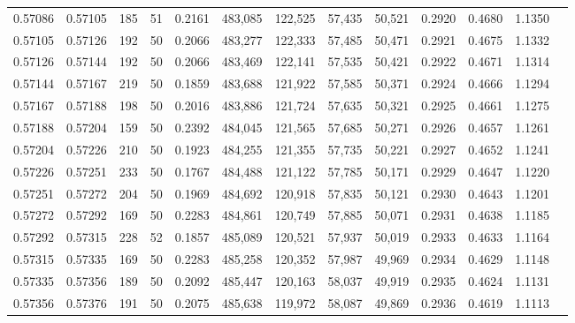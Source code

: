 \begin{tabular}{rrrrrrrrrrrrr}
0.57086 & 0.57105 &   185 &  51 &                                     0.2161 & 483,085 & 122,525 &  57,435 &  50,521 & 0.2920 & 0.4680 & 1.1350 \\
0.57105 & 0.57126 &   192 &  50 &                                     0.2066 & 483,277 & 122,333 &  57,485 &  50,471 & 0.2921 & 0.4675 & 1.1332 \\
0.57126 & 0.57144 &   192 &  50 &                                     0.2066 & 483,469 & 122,141 &  57,535 &  50,421 & 0.2922 & 0.4671 & 1.1314 \\
0.57144 & 0.57167 &   219 &  50 &                                     0.1859 & 483,688 & 121,922 &  57,585 &  50,371 & 0.2924 & 0.4666 & 1.1294 \\
0.57167 & 0.57188 &   198 &  50 &                                     0.2016 & 483,886 & 121,724 &  57,635 &  50,321 & 0.2925 & 0.4661 & 1.1275 \\
0.57188 & 0.57204 &   159 &  50 &                                     0.2392 & 484,045 & 121,565 &  57,685 &  50,271 & 0.2926 & 0.4657 & 1.1261 \\
0.57204 & 0.57226 &   210 &  50 &                                     0.1923 & 484,255 & 121,355 &  57,735 &  50,221 & 0.2927 & 0.4652 & 1.1241 \\
0.57226 & 0.57251 &   233 &  50 &                                     0.1767 & 484,488 & 121,122 &  57,785 &  50,171 & 0.2929 & 0.4647 & 1.1220 \\
0.57251 & 0.57272 &   204 &  50 &                                     0.1969 & 484,692 & 120,918 &  57,835 &  50,121 & 0.2930 & 0.4643 & 1.1201 \\
0.57272 & 0.57292 &   169 &  50 &                                     0.2283 & 484,861 & 120,749 &  57,885 &  50,071 & 0.2931 & 0.4638 & 1.1185 \\
0.57292 & 0.57315 &   228 &  52 &                                     0.1857 & 485,089 & 120,521 &  57,937 &  50,019 & 0.2933 & 0.4633 & 1.1164 \\
0.57315 & 0.57335 &   169 &  50 &                                     0.2283 & 485,258 & 120,352 &  57,987 &  49,969 & 0.2934 & 0.4629 & 1.1148 \\
0.57335 & 0.57356 &   189 &  50 &                                     0.2092 & 485,447 & 120,163 &  58,037 &  49,919 & 0.2935 & 0.4624 & 1.1131 \\
0.57356 & 0.57376 &   191 &  50 &                                     0.2075 & 485,638 & 119,972 &  58,087 &  49,869 & 0.2936 & 0.4619 & 1.1113 \\

\end{tabular}
